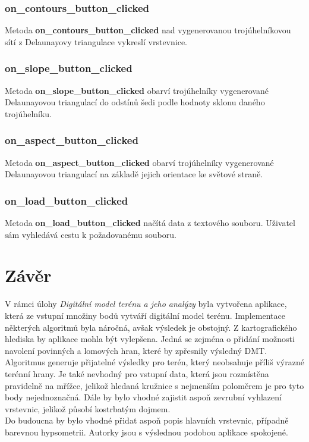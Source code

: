 \documentclass[a4paper, 12pt]{article}
\begin{document}
\subsubsection*{on\_contours\_button\_clicked}
Metoda \textbf{on\_contours\_button\_clicked} nad vygenerovanou trojúhelníkovou sítí z Delaunayovy triangulace vykreslí vrstevnice. 

\subsubsection*{on\_slope\_button\_clicked}
Metoda \textbf{on\_slope\_button\_clicked} obarví trojúhelníky vygenerované Delaunayovou triangulací do odstínů šedi podle hodnoty sklonu daného trojúhelníku.

\subsubsection*{on\_aspect\_button\_clicked}
Metoda \textbf{on\_aspect\_button\_clicked} obarví trojúhelníky vygenerované Delaunayovou triangulací na základě jejich orientace ke světové straně.

\subsubsection*{on\_load\_button\_clicked}
Metoda \textbf{on\_load\_button\_clicked} načítá data z textového souboru. Uživatel sám vyhledává cestu k požadovanému souboru.

\clearpage
\section{Závěr}
V rámci úlohy \textit{Digitální model terénu a jeho analýzy} byla vytvořena aplikace, která ze vstupní množiny bodů vytváří digitální model terénu. Implementace některých algoritmů byla náročná, avšak výsledek je obstojný. Z kartografického hlediska by aplikace mohla být  vylepšena. Jedná se zejména o přidání možnosti navolení povinných a lomových hran, které by zpřesnily výsledný DMT. Algoritmus generuje přijatelné výsledky pro terén, který neobsahuje příliš výrazné terénní hrany. Je také nevhodný pro vstupní data, která jsou rozmístěna pravidelně na mřížce, jelikož hledaná kružnice s nejmenším poloměrem je pro tyto body nejednoznačná. Dále by bylo vhodné zajistit aspoň zevrubní vyhlazení vrstevnic, jelikož působí kostrbatým dojmem. \\

Do budoucna by bylo vhodné přidat aspoň popis hlavních vrstevnic, případně barevnou hypsometrii. Autorky jsou s výslednou podobou aplikace spokojené. 
\clearpage
\end{document}
